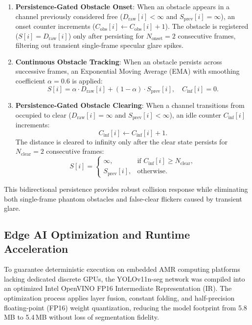 \documentclass{ieeeaccess}
\begin{document}
\begin{enumerate}
  \item \textbf{Persistence-Gated Obstacle Onset}: When an obstacle appears in a channel previously considered free ($D_{\mathrm{raw}}[i] < \infty$ and $S_{\mathrm{prev}}[i] = \infty$), an onset counter increments ($C_{\mathrm{obs}}[i] \gets C_{\mathrm{obs}}[i] + 1$). The obstacle is registered ($S[i] = D_{\mathrm{raw}}[i]$) only after persisting for $N_{\mathrm{onset}} = 2$ consecutive frames, filtering out transient single-frame specular glare spikes.
  \item \textbf{Continuous Obstacle Tracking}: When an obstacle persists across successive frames, an Exponential Moving Average (EMA) with smoothing coefficient $\alpha = 0.6$ is applied:
  \begin{equation}
    S[i] = \alpha \cdot D_{\mathrm{raw}}[i] + (1 - \alpha) \cdot S_{\mathrm{prev}}[i], \quad C_{\mathrm{inf}}[i] = 0.
  \end{equation}
  \item \textbf{Persistence-Gated Obstacle Clearing}: When a channel transitions from occupied to clear ($D_{\mathrm{raw}}[i] = \infty$ and $S_{\mathrm{prev}}[i] < \infty$), an idle counter $C_{\mathrm{inf}}[i]$ increments:
  \begin{equation}
    C_{\mathrm{inf}}[i] \gets C_{\mathrm{inf}}[i] + 1.
  \end{equation}
  The distance is cleared to infinity only after the clear state persists for $N_{\mathrm{clear}} = 2$ consecutive frames:
  \begin{equation}
    S[i] = \begin{cases} \infty, & \text{if } C_{\mathrm{inf}}[i] \ge N_{\mathrm{clear}}, \\ S_{\mathrm{prev}}[i], & \text{otherwise.} \end{cases}
  \end{equation}
\end{enumerate}
This bidirectional persistence provides robust collision response while eliminating both single-frame phantom obstacles and false-clear flickers caused by transient glare.

\subsection{Edge AI Optimization and Runtime Acceleration}
\label{subsec:edge_acceleration}
To guarantee deterministic execution on embedded AMR computing platforms lacking dedicated discrete GPUs, the YOLOv11n-seg network was compiled into an optimized Intel OpenVINO FP16 Intermediate Representation (IR). The optimization process applies layer fusion, constant folding, and half-precision floating-point (FP16) weight quantization, reducing the model footprint from 5.8\,MB to 5.4\,MB without loss of segmentation fidelity.
\end{document}
